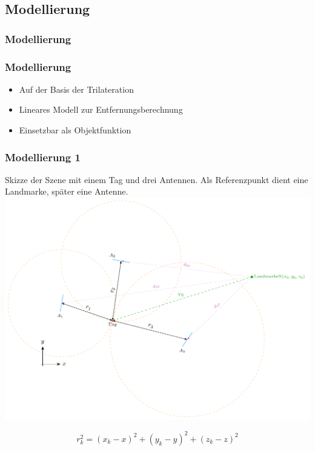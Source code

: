 \subsection{Modellierung}
\begin{frame}
  \frametitle{Modellierung} %
\end{frame}
\begin{frame}
  \frametitle{Modellierung}
%
\begin{itemize} 
  \item Auf der Basis der Trilateration
  \pause 
  \item Lineares Modell zur Entfernungsberechnung
  \pause 
  \item Einsetzbar als Objektfunktion
\end{itemize} 
	
%
\end{frame}
\begin{frame}
  \frametitle{Modellierung  1}
%
  \begin{center}
	\tiny Skizze der Szene mit einem Tag und drei Antennen. Als Referenzpunkt dient eine Landmarke, später eine Antenne.
%
  	\includegraphics[width=.7\textwidth]{../img/trilaterationScene.pdf}
  \end{center}
\[
r_k^2= (x_k-x )^2 + (y_k-y )^2 + (z_k-z )^2
\]
\end{frame}
